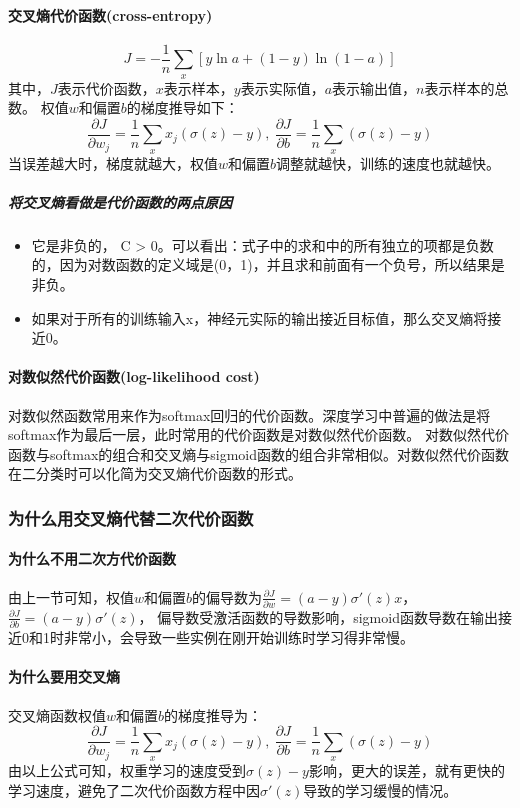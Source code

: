 \documentclass[UTF8]{ctexart}
\begin{document}
\paragraph{交叉熵代价函数(cross-entropy)}
$$J = -\frac{1}{n}\sum_x[y\ln a + (1-y)\ln{(1-a)}]$$
其中，$J$表示代价函数，$x$表示样本，$y$表示实际值，$a$表示输出值，$n$表示样本的总数。
权值$w$和偏置$b​$的梯度推导如下：
$$\frac{\partial J}{\partial w_j}=\frac{1}{n}\sum_{x}x_j(\sigma{(z)}-y),\ 
\frac{\partial J}{\partial b}=\frac{1}{n}\sum_{x}(\sigma{(z)}-y)$$
当误差越大时，梯度就越大，权值$w$和偏置$b$调整就越快，训练的速度也就越快。
\subparagraph{将交叉熵看做是代价函数的两点原因}
\begin{itemize}
	\item 它是⾮负的， C > 0。可以看出：式子中的求和中的所有独⽴的项都是负数的，因为对数函数的定义域是(0，1)，并且求和前⾯有⼀个负号，所以结果是非负。
	\item 如果对于所有的训练输⼊x，神经元实际的输出接近⽬标值，那么交叉熵将接近0。
\end{itemize}
\paragraph{对数似然代价函数(log-likelihood cost)}
对数似然函数常用来作为softmax回归的代价函数。深度学习中普遍的做法是将softmax作为最后一层，此时常用的代价函数是对数似然代价函数。
对数似然代价函数与softmax的组合和交叉熵与sigmoid函数的组合非常相似。对数似然代价函数在二分类时可以化简为交叉熵代价函数的形式。
\subsubsection{为什么用交叉熵代替二次代价函数}
\paragraph{为什么不用二次方代价函数}
由上一节可知，权值$w$和偏置$b$的偏导数为$\frac{\partial J}{\partial w}=(a-y)\sigma'(z)x$，$\frac{\partial J}{\partial b}=(a-y)\sigma'(z)$， 偏导数受激活函数的导数影响，sigmoid函数导数在输出接近0和1时非常小，会导致一些实例在刚开始训练时学习得非常慢。
\paragraph{为什么要用交叉熵}
交叉熵函数权值$w$和偏置$b$的梯度推导为：
$$\frac{\partial J}{\partial w_j}=\frac{1}{n}\sum_{x}x_j(\sigma{(z)}-y),\ 
\frac{\partial J}{\partial b}=\frac{1}{n}\sum_{x}(\sigma{(z)}-y)$$
由以上公式可知，权重学习的速度受到$\sigma{(z)}-y$影响，更大的误差，就有更快的学习速度，避免了二次代价函数方程中因$\sigma'{(z)}$导致的学习缓慢的情况。
\end{document}
